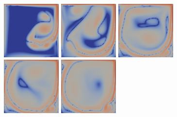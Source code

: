 \documentclass[english, nochinese]{pkupaper}
\begin{document}
\begin{figure}[htbp]
{
\centering
{
\includegraphics[width=3cm]{Results/Figure02a.png}
\includegraphics[width=3cm]{Results/Figure02b.png}
\includegraphics[width=3cm]{Results/Figure02c.png}
\includegraphics[width=3cm]{Results/Figure02d.png}
\includegraphics[width=3cm]{Results/Figure02e.png}
}

}
\end{figure}
\end{document}
